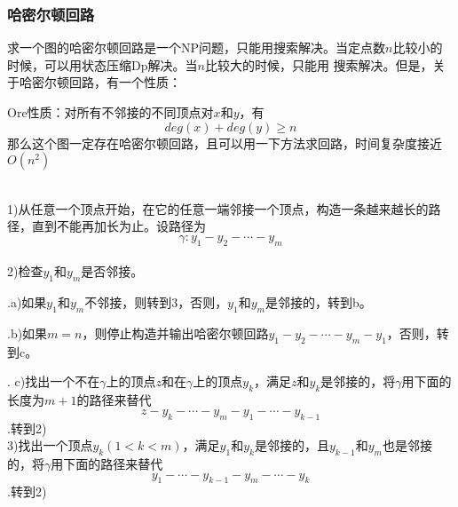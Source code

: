 \subsubsection{哈密尔顿回路}
求一个图的哈密尔顿回路是一个NP问题，只能用搜索解决。当定点数$n$比较小的时候，可以用状态压缩Dp解决。当$n$比较大的时候，只能用
搜索解决。但是，关于哈密尔顿回路，有一个性质：\par
Ore性质：对所有不邻接的不同顶点对$x$和$y$，有$$deg(x)+deg(y)\geq n$$
那么这个图一定存在哈密尔顿回路，且可以用一下方法求回路，时间复杂度接近$O(n^2)$ \par
~\\
1)从任意一个顶点开始，在它的任意一端邻接一个顶点，构造一条越来越长的路径，直到不能再加长为止。设路径为$$\gamma:y_1-y_2-\cdots-y_m$$
~\\
2)检查$y_1$和$y_m$是否邻接。\par
.\quad \quad a)如果$y_1$和$y_m$不邻接，则转到3，否则，$y_1$和$y_m$是邻接的，转到b。\par
.\quad \quad b)如果$m=n$，则停止构造并输出哈密尔顿回路$y_1-y_2-\cdots-y_m-y_1$，否则，转到c。\par
.\quad \quad
c)找出一个不在$\gamma$上的顶点$z$和在$\gamma$上的顶点$y_k$，满足$z$和$y_k$是邻接的，将$\gamma$用下面的长度为$m+1$的路径来替代
$$z-y_k-\cdots-y_m-y_1-\cdots-y_{k-1}$$
.\quad \quad 转到2)
~\\
3)找出一个顶点$y_k(1<k<m)$，满足$y_1$和$y_k$是邻接的，且$y_{k-1}$和$y_{m}$也是邻接的，将$\gamma$用下面的路径来替代
$$y_1-\cdots-y_{k-1}-y_{m}-\cdots-y_k$$
.\quad \quad 转到2)
